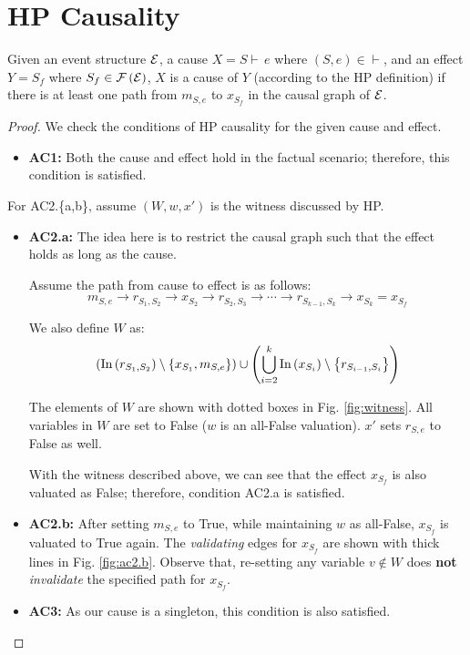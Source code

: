 \section{HP Causality}

\begin{thm}
Given an event structure $\mathcal{E}$, a cause $X = S \vdash\,e$
where $(S, e) \in \vdash$, and an effect $Y = S_f$
where $S_f \in \mathcal{F} \left( \mathcal{E} \right)$, $X$ is a cause of $Y$
(according to the HP definition) if there is at least one path
from $m_{S,e}$ to $x_{S_f}$ in the causal graph of $\mathcal{E}$.
\end{thm}

\begin{proof}
We check the conditions of HP causality for the given cause and effect.

\begin{itemize}
  \item \textbf{AC1:} Both the cause and effect hold in the factual scenario;
  therefore, this condition is satisfied.
\end{itemize}

For AC2.\{a,b\}, assume $(W, w, x')$ is the witness discussed by HP.

\begin{itemize}  
  \item \textbf{AC2.a:} The idea here is to restrict the causal graph
  such that the effect holds as long as the cause.
  
  Assume the path from cause to effect is as follows:
  \[
    m_{S,e} \rightarrow
    r_{S_1,S_2} \rightarrow
    x_{S_2} \rightarrow
    r_{S_2, S_3} \rightarrow
    \cdots \rightarrow
    r_{S_{k-1}, S_k} \rightarrow x_{S_k} = x_{S_f}
  \]

  We also define $W$ as:
  \[ \left( \text{In} \left( r_{S_1, S_2} \right) \setminus \left\{ x_{S_1}, m_{S,e} \right\} \right) \cup
    \left( \bigcup_{i=2}^k \text{In} \left( x_{S_i} \right) \setminus \left\{ r_{S_{i-1}, S_i} \right\} \right) \]
   
  The elements of $W$ are shown with dotted boxes in Fig. \ref{fig:witness}.
  All variables in $W$ are set to False ($w$ is an all-False valuation).
  $x'$ sets $r_{S,e}$ to False as well.
  
  

  With the witness described above, we can see that the effect $x_{S_f}$
  is also valuated as False; therefore, condition AC2.a is satisfied.
  
  
  \item \textbf{AC2.b:} After setting $m_{S,e}$ to True,
  while maintaining $w$ as all-False, $x_{S_f}$ is valuated to True again.
  The \textit{validating} edges for $x_{S_f}$ are shown with thick lines
  in Fig. \ref{fig:ac2.b}. Observe that, re-setting any variable $v \not\in W$
  does \textbf{not} \textit{invalidate} the specified path for $x_{S_f}$.

  

  \item \textbf{AC3:} As our cause is a singleton,
  this condition is also satisfied.
\end{itemize}

\end{proof}